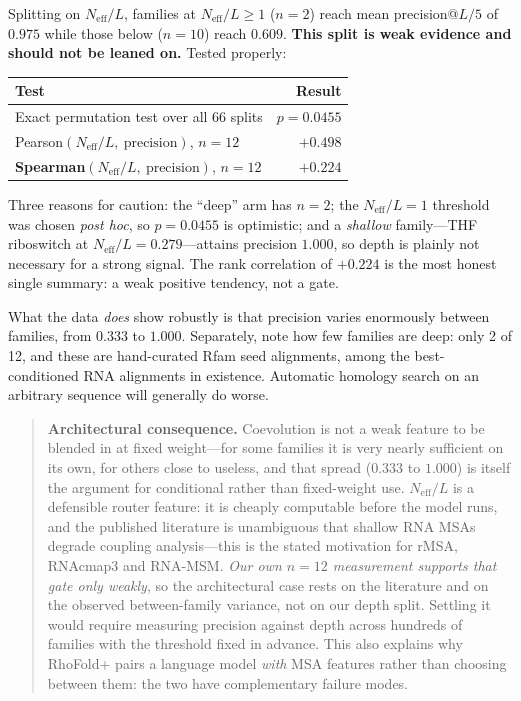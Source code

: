 \documentclass[11pt,a4paper]{article}
\begin{document}
Splitting on $N_{\text{eff}}/L$, families at $N_{\text{eff}}/L \geq 1$ ($n=2$)
reach mean precision@$L/5$ of $0.975$ while those below ($n=10$) reach $0.609$.
\textbf{This split is weak evidence and should not be leaned on.} Tested properly:

\begin{table}[h]
\centering
\small
\begin{tabular}{@{}lr@{}}
\toprule
\textbf{Test} & \textbf{Result} \\
\midrule
Exact permutation test over all 66 splits & $p = 0.0455$ \\
Pearson$(N_{\text{eff}}/L,\ \text{precision})$, $n=12$ & $+0.498$ \\
\textbf{Spearman}$(N_{\text{eff}}/L,\ \text{precision})$, $n=12$ & $\mathbf{+0.224}$ \\
\bottomrule
\end{tabular}
\end{table}

Three reasons for caution: the ``deep'' arm has $n=2$; the
$N_{\text{eff}}/L = 1$ threshold was chosen \emph{post hoc}, so $p = 0.0455$ is
optimistic; and a \emph{shallow} family---THF riboswitch at
$N_{\text{eff}}/L = 0.279$---attains precision $1.000$, so depth is plainly not
necessary for a strong signal. The rank correlation of $+0.224$ is the most
honest single summary: a weak positive tendency, not a gate.

What the data \emph{does} show robustly is that precision varies enormously
between families, from $0.333$ to $1.000$. Separately, note how few families are
deep: only 2 of 12, and these are hand-curated Rfam seed alignments, among the
best-conditioned RNA alignments in existence. Automatic homology search on an
arbitrary sequence will generally do worse.

\begin{quote}
\textbf{Architectural consequence.} Coevolution is not a weak feature to be
blended in at fixed weight---for some families it is very nearly sufficient on
its own, for others close to useless, and that spread ($0.333$ to $1.000$) is
itself the argument for conditional rather than fixed-weight use.
$N_{\text{eff}}/L$ is a defensible router feature: it is cheaply computable
before the model runs, and the published literature is unambiguous that shallow
RNA MSAs degrade coupling analysis---this is the stated motivation for rMSA,
RNAcmap3 and RNA-MSM. \emph{Our own $n=12$ measurement supports that gate only
weakly}, so the architectural case rests on the literature and on the observed
between-family variance, not on our depth split. Settling it would require
measuring precision against depth across hundreds of families with the threshold
fixed in advance. This also explains why RhoFold+ pairs a language model
\emph{with} MSA features rather than choosing between them: the two have
complementary failure modes.
\end{quote}
\end{document}
